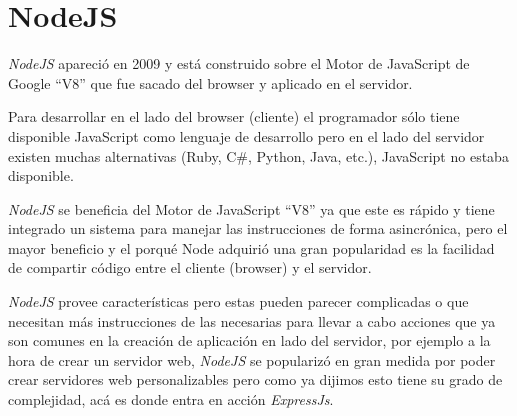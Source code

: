 \section{NodeJS}
\label{sec:node_js}
  \emph{NodeJS} apareció en 2009 y está construido sobre el Motor de JavaScript de Google ``V8'' que fue sacado del browser y aplicado en el servidor.

  Para desarrollar en el lado del browser (cliente) el programador sólo tiene disponible JavaScript como lenguaje de desarrollo pero en el lado del servidor existen muchas alternativas (Ruby, C\#, Python, Java, etc.), JavaScript no estaba disponible.

  \emph{NodeJS} se beneficia del Motor de JavaScript ``V8'' ya que este es rápido y tiene integrado un sistema para manejar las instrucciones de forma asincrónica, pero el mayor beneficio y el porqué Node adquirió una gran popularidad es la facilidad de compartir código entre el cliente (browser) y el servidor. 

  \emph{NodeJS} provee características pero estas pueden parecer complicadas o que necesitan más instrucciones de las necesarias para llevar a cabo acciones que ya son comunes en la creación de aplicación en lado del servidor, por ejemplo a la hora de crear un servidor web, \emph{NodeJS} se popularizó en gran medida por poder crear servidores web personalizables pero como ya dijimos esto tiene su grado de complejidad, acá es donde entra en acción \emph{ExpressJs}. \cite{node_works}
